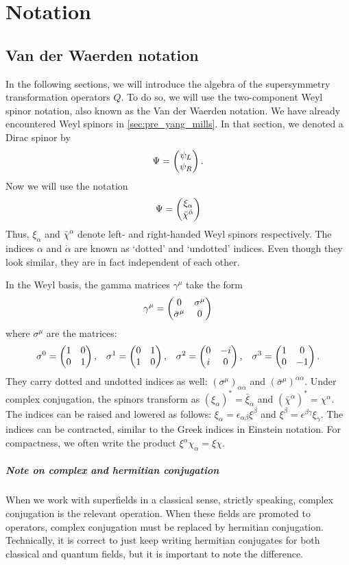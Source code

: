 \chapter{Notation}\label{ch:notation}
\section{Van der Waerden notation}
In the following sections, we will introduce the algebra of the supersymmetry transformation operators $Q$. To do so, we will use the two-component Weyl spinor notation, also known as the Van der Waerden notation. We have already encountered Weyl spinors in \autoref{sec:pre_yang_mills}. In that section, we denoted a Dirac spinor by
\begin{equation*}
\Psi = \begin{pmatrix} \psi_L \\ \psi_R\end{pmatrix}.
\end{equation*}
Now we will use the notation
\begin{equation*}
  \Psi = \begin{pmatrix} \xi_\alpha \\ \bar{\chi}^{\dot{\alpha}}\end{pmatrix}
\end{equation*}
Thus, $\xi_\alpha$ and $\bar{\chi}^{\dot{\alpha}}$ denote left- and right-handed Weyl spinors respectively. The indices $\alpha$ and $\dot{\alpha}$ are known as `dotted' and `undotted' indices. Even though they look similar, they are in fact independent of each other.

In the Weyl basis, the gamma matrices $\gamma^\mu$ take the form
\begin{equation}
  \gamma^\mu = \begin{pmatrix} 0 & \sigma^\mu \\ \bar{\sigma}^\mu & 0\end{pmatrix}
\end{equation}
where $\sigma^\mu$ are the matrices:
\begin{align*}
\sigma^0 = \begin{pmatrix} 1 & 0 \\ 0 & 1\end{pmatrix}, && \sigma^1 = \begin{pmatrix} 0 & 1 \\ 1 & 0\end{pmatrix}, && \sigma^2 = \begin{pmatrix} 0 & -i \\ i & 0\end{pmatrix}, && \sigma^3 = \begin{pmatrix} 1 & 0 \\ 0 & -1\end{pmatrix}.
\end{align*}
They carry dotted and undotted indices as well: $(\sigma^\mu)_{\alpha\dot{\alpha}}$ and $(\bar{\sigma}^\mu)^{\dot{\alpha}\alpha}$. Under complex conjugation, the spinors transform as
$(\xi_\alpha)^* = \bar{\xi}_{\dot{\alpha}}$ and $(\bar{\chi}^{\dot{\alpha}})^* = \chi^{\alpha}$. The indices can be raised and lowered as follows: $\xi_\alpha = \epsilon_{\alpha\beta}\xi^\beta$ and $\xi^\beta = \epsilon^{\beta\gamma}\xi_\gamma$.
The indices can be contracted, similar to the Greek indices in Einstein notation. For compactness, we often write the product $\xi^\alpha\chi_\alpha = \xi\chi$.

\paragraph{Note on complex and hermitian conjugation} When we work with superfields in a classical sense, strictly speaking, complex conjugation is the relevant operation. When these fields are promoted to operators, complex conjugation must be replaced by hermitian conjugation. Technically, it is correct to just keep writing hermitian conjugates for both classical and quantum fields, but it is important to note the difference.
